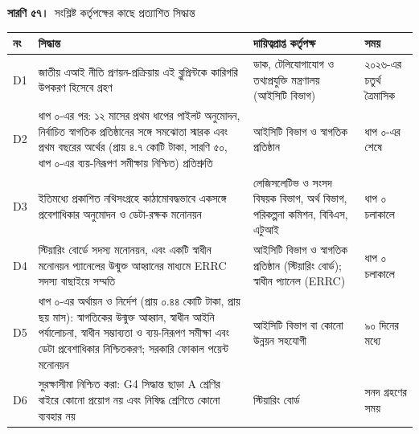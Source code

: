 \documentclass[border=10pt]{standalone}
\begin{document}
\begin{minipage}{17cm}
{\large\bfseries সারণি ৫৭।}\ {\large সংশ্লিষ্ট কর্তৃপক্ষের কাছে প্রত্যাশিত সিদ্ধান্ত}\par\vspace{7pt}
\small
{}
\begin{tabularx}{\linewidth}{@{}>{\hsize=0.276\hsize\raggedright\arraybackslash}X>{\hsize=2.023\hsize\raggedright\arraybackslash}X>{\hsize=1.103\hsize\raggedright\arraybackslash}X>{\hsize=0.598\hsize\raggedright\arraybackslash}X@{}}
\arrayrulecolor{bapilrule}\toprule
\rowcolor{white}\textbf{নং} & \textbf{সিদ্ধান্ত} & \textbf{দায়িত্বপ্রাপ্ত কর্তৃপক্ষ} & \textbf{সময়} \\
\midrule
D1 & জাতীয় এআই নীতি প্রণয়ন-প্রক্রিয়ায় এই ব্লুপ্রিন্টকে কারিগরি উপকরণ হিসেবে গ্রহণ & ডাক, টেলিযোগাযোগ ও তথ্যপ্রযুক্তি মন্ত্রণালয় (আইসিটি বিভাগ) & ২০২৬-এর চতুর্থ ত্রৈমাসিক \\
D2 & ধাপ ০-এর পর: ১২ মাসের প্রথম ধাপের পাইলট অনুমোদন, নির্বাচিত স্বাগতিক প্রতিষ্ঠানের সঙ্গে সমঝোতা স্মারক এবং প্রথম বছরের অর্থের (প্রায় ৪.৭ কোটি টাকা, সারণি ৫০, ধাপ ০-এর ব্যয়-নিরূপণ সমীক্ষায় নিশ্চিত) প্রতিশ্রুতি & আইসিটি বিভাগ ও স্বাগতিক প্রতিষ্ঠান & ধাপ ০-এর শেষে \\
D3 & ইতিমধ্যে প্রকাশিত নথিসংগ্রহে কাঠামোবদ্ধভাবে একসঙ্গে প্রবেশাধিকার অনুমোদন ও ডেটা-রক্ষক মনোনয়ন & লেজিসলেটিভ ও সংসদ বিষয়ক বিভাগ, অর্থ বিভাগ, পরিকল্পনা কমিশন, বিবিএস, এটুআই & ধাপ ০ চলাকালে \\
D4 & স্টিয়ারিং বোর্ডে সদস্য মনোনয়ন, এবং একটি স্বাধীন মনোনয়ন প্যানেলের উন্মুক্ত আহ্বানের মাধ্যমে ERRC সদস্য বাছাইয়ে সম্মতি & আইসিটি বিভাগ ও স্বাগতিক প্রতিষ্ঠান (স্টিয়ারিং বোর্ড); স্বাধীন প্যানেল (ERRC) & ধাপ ০ চলাকালে \\
D5 & ধাপ ০-এর অর্থায়ন ও নির্দেশ (প্রায় ০.৪৪ কোটি টাকা, প্রায় ছয় মাস): স্বাগতিকের উন্মুক্ত আহ্বান, স্বাধীন আইনি পর্যালোচনা, স্বাধীন সম্ভাব্যতা ও ব্যয়-নিরূপণ সমীক্ষা এবং ডেটা প্রবেশাধিকার নিশ্চিতকরণ; সরকারি ফোকাল পয়েন্ট মনোনয়ন & আইসিটি বিভাগ বা কোনো উন্নয়ন সহযোগী & ৯০ দিনের মধ্যে \\
D6 & সুরক্ষাসীমা নিশ্চিত করা: G4 সিদ্ধান্ত ছাড়া A শ্রেণির বাইরে কোনো প্রয়োগ নয় এবং নিষিদ্ধ শ্রেণিতে কোনো ব্যবহার নয় & স্টিয়ারিং বোর্ড & সনদ গ্রহণের সময় \\
\bottomrule
\end{tabularx}
\par\vspace{5pt}{\footnotesize\itshape সময়ের ক্রমে প্রথমে D1 ও D5; ধাপ ০ চলাকালে D3 ও D4 প্রস্তুত হয়; ধাপ ০-এর পরে D2 এবং সনদ গ্রহণের সময় D6। এসব সিদ্ধান্তের কোনোটিই কোনো সংবিধিবদ্ধ সংস্থা সৃষ্টি করে না বা BAPIL-কে আইনি ক্ষমতা দেয় না। মাস ১-এর আগে প্রয়োজনীয় অনুমোদন ও চুক্তির তালিকা সংযুক্তি ন-তে (সারণি ৬৫) দেওয়া আছে।}
\par{}
\end{minipage}
\end{document}
